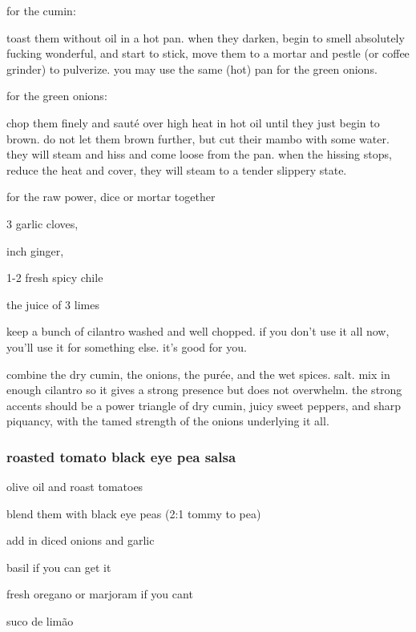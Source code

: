 for the cumin:

toast them without oil in a hot pan. when they darken, begin to smell
absolutely fucking wonderful, and start to stick, move them to a
mortar and pestle (or coffee grinder) to pulverize. you may use the
same (hot) pan for the green onions.

for the green onions:

chop them finely and saut\'{e} over high heat in hot oil until they
just begin to brown. do not let them brown further, but cut their
mambo with some water. they will steam and hiss and come loose from
the pan. when the hissing stops, reduce the heat and cover, they will
steam to a tender slippery state.

for the raw power, dice or mortar together

\begin{ingredients}
  \item 3 garlic cloves,
  \item \onehalf inch ginger,
  \item 1-2 fresh spicy chile
  \item the juice of 3 limes
\end{ingredients}

keep a bunch of cilantro washed and well chopped. if you don't use it
all now, you'll use it for something else. it's good for you.

combine the dry cumin, the onions, the pur\'{e}e, and the wet
spices. salt. mix in enough cilantro so it gives a strong presence but
does not overwhelm. the strong accents should be a power triangle of
dry cumin, juicy sweet peppers, and sharp piquancy, with the tamed
strength of the onions underlying it all.

\subsubsection{roasted tomato black eye pea salsa}

\begin{ingredients}
  \item olive oil and roast tomatoes
  \item blend them with black eye peas (2:1 tommy to pea)
  \item add in diced onions and garlic
  \item basil if you can get it
  \item fresh oregano or marjoram if you cant
  \item suco de lim\~{a}o
\end{ingredients}

